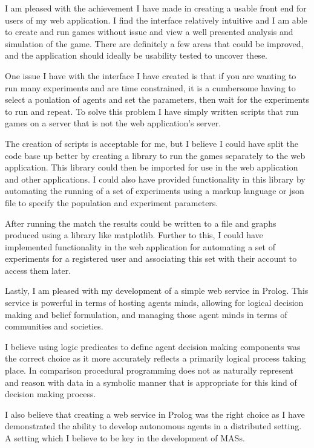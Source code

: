 \documentclass[]{final_report}
\begin{document}
I am pleased with the achievement I have made in creating a usable front end for users of my web application. I find the interface relatively intuitive and I am able to create and run games without issue and view a well presented analysis and simulation of the game. There are definitely a few areas that could be improved, and the application should ideally be usability tested to uncover these.\par 
One issue I have with the interface I have created is that if you are wanting to run many experiments and are time constrained, it is a cumbersome having to select a poulation of agents and set the parameters, then wait for the experiments to run and repeat. To solve this problem I have simply written scripts that run games on a server that is not the web application's server.\par 
The creation of scripts is acceptable for me, but I believe I could have split the code base up better by creating a library to run the games separately to the web application. This library could then be imported for use in the web application and other applications. I could also have provided functionality in this library by automating the running of a set of experiments using a markup language or json file to specify the population and experiment parameters.\par 
After running the match the results could be written to a file and graphs produced using a library like matplotlib. Further to this, I could have implemented functionality in the web application for automating a set of experiments for a registered user and associating this set with their account to access them later.\par 
Lastly, I am pleased with my development of a simple web service in Prolog. This service is powerful in terms of hosting agents minds, allowing for logical decision making and belief formulation, and managing those agent minds in terms of communities and societies.\par 
I believe using logic predicates to define agent decision making components was the correct choice as it more accurately reflects a primarily logical process taking place. In comparison procedural programming does not as naturally represent and reason with data in a symbolic manner that is appropriate for this kind of decision making process.\par 
I also believe that creating a web service in Prolog was the right choice as I have demonstrated the ability to develop autonomous agents in a distributed setting. A setting which I believe to be key in the development of MASs.
\end{document}
